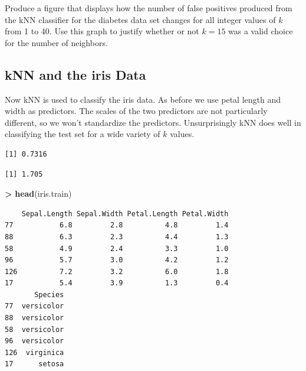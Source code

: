 \documentclass[
]{krantz}
\makeatletter
\newenvironment{Shaded}{\begin{snugshade}}{\end{snugshade}}
\newcommand{\KeywordTok}[1]{\textcolor[rgb]{0.27,0.27,0.27}{\textbf{#1}}}
\newcommand{\NormalTok}[1]{#1}
\newcommand{\OperatorTok}[1]{\textcolor[rgb]{0.43,0.43,0.43}{\textbf{#1}}}
\newcommand{\StringTok}[1]{\textcolor[rgb]{0.5,0.5,0.5}{#1}}
\newenvironment{kframe}{%
\medskip{}
\setlength{\fboxsep}{.8em}
 \def\at@end@of@kframe{}%
 \ifinner\ifhmode%
  \def\at@end@of@kframe{\end{minipage}}%
  \begin{minipage}{\columnwidth}%
 \fi\fi%
 \def\FrameCommand##1{\hskip\@totalleftmargin \hskip-\fboxsep
 \colorbox{shadecolor}{##1}\hskip-\fboxsep
     \hskip-\linewidth \hskip-\@totalleftmargin \hskip\columnwidth}%
 \MakeFramed {\advance\hsize-\width
   \@totalleftmargin\z@ \linewidth\hsize
   \@setminipage}}%
 {\par\unskip\endMakeFramed%
 \at@end@of@kframe}
\renewenvironment{Shaded}{\begin{kframe}}{\end{kframe}}
\makeatother
\begin{document}
Produce a figure that displays how the number of false positives produced from the kNN classifier for the diabetes data set changes for all integer values of \(k\) from 1 to 40. Use this graph to justify whether or not \(k = 15\) was a valid choice for the number of neighbors.

\hypertarget{knn-and-the-iris-data}{%
\subsection{kNN and the iris Data}\label{knn-and-the-iris-data}}

Now kNN is used to classify the iris data. As before we use petal length and width as predictors. The scales of the two predictors are not particularly different, so we won't standardize the predictors. Unsurprisingly kNN does well in classifying the test set for a wide variety of \(k\) values.

\begin{Shaded}
\end{Shaded}

\begin{verbatim}
[1] 0.7316
\end{verbatim}

\begin{Shaded}
\end{Shaded}

\begin{verbatim}
[1] 1.705
\end{verbatim}

\begin{Shaded}
\begin{Highlighting}[]
\OperatorTok{\textgreater{}}\StringTok{ }\KeywordTok{head}\NormalTok{(iris.train)}
\end{Highlighting}
\end{Shaded}

\begin{verbatim}
    Sepal.Length Sepal.Width Petal.Length Petal.Width
77           6.8         2.8          4.8         1.4
88           6.3         2.3          4.4         1.3
58           4.9         2.4          3.3         1.0
96           5.7         3.0          4.2         1.2
126          7.2         3.2          6.0         1.8
17           5.4         3.9          1.3         0.4
       Species
77  versicolor
88  versicolor
58  versicolor
96  versicolor
126  virginica
17      setosa
\end{verbatim}
\end{document}
